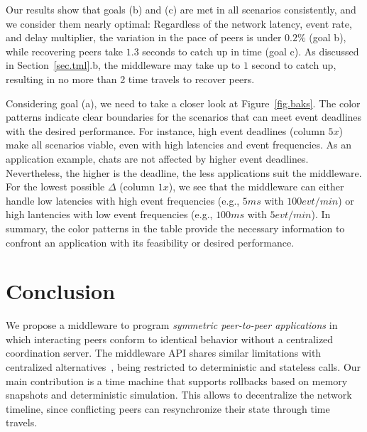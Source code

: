 \documentclass[sn-mathphys,iicol]{sn-jnl}%
\begin{document}

Our results show that goals (b) and (c) are met in all scenarios consistently,
and we consider them nearly optimal:
Regardless of the network latency, event rate, and delay multiplier,
    the variation in the pace of peers is under $0.2\%$ (goal b), while
    recovering peers take $1.3$ seconds to catch up in time (goal c).
As discussed in Section~\ref{sec.tml}.b, the middleware may take up to $1$
second to catch up, resulting in no more than 2 time travels to recover peers.

Considering goal (a), we need to take a closer look at Figure~\ref{fig.baks}.
The color patterns indicate clear boundaries for the scenarios that can meet
event deadlines with the desired performance.
%
For instance, high event deadlines (column $5x$) make all scenarios viable,
even with high latencies and event frequencies.
As an application example, chats are not affected by higher event deadlines.
Nevertheless, the higher is the deadline, the less applications suit the
middleware.
%
For the lowest possible $\Delta$ (column $1x$), we see that the middleware can
either handle low latencies with high event frequencies (e.g., $5ms$ with
$100evt/min$) or high lantencies with low event frequencies (e.g., $100ms$ with
$5evt/min$).
%
In summary, the color patterns in the table provide the necessary information
to confront an application with its feasibility or desired performance.


\section{Conclusion}
\label{sec.conclusion}

We propose a middleware to program \emph{symmetric peer-to-peer applications}
in which interacting peers conform to identical behavior without a centralized
coordination server.
%
The middleware API shares similar limitations with centralized
alternatives~\cite{gals,croquet}, being restricted to deterministic and
stateless calls. %
%
Our main contribution is a time machine that supports rollbacks based on memory
snapshots and deterministic simulation.
This allows to decentralize the network timeline, since conflicting peers can
resynchronize their state through time travels.
%
\end{document}
